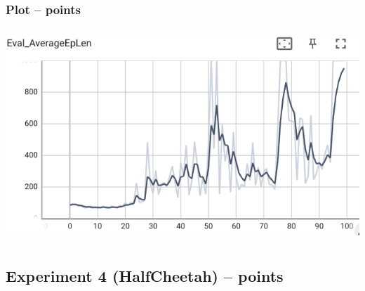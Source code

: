 \documentclass{article}
\begin{document}
\subsubsection{Plot --  points\rbrack}
\begin{answer}[title=Q7.1.2,height=10cm,width=\linewidth]
\centering
\includegraphics[height=8cm]{hw2/7.1.2.png}
\end{answer}

\subsection{Experiment 4 (HalfCheetah) --  points\rbrack}
\end{document}
